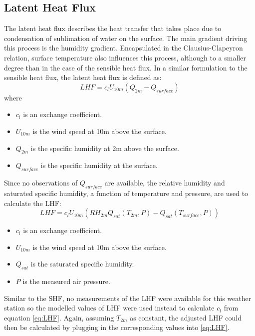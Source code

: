 \documentclass{article}
\begin{document}
\subsection*{Latent Heat Flux}
The latent heat flux describes the heat transfer that takes place due to condensation of sublimation of water on the surface. 
The main gradient driving this process is the humidity gradient. 
Encapsulated in the Clausius-Clapeyron relation, surface temperature also influences this process, although to a smaller degree than in the case of the sensible heat flux.
In a similar formulation to the sensible heat flux, the latent heat flux is defined as: 
\begin{equation*}
  LHF = c_l U_{10m} (Q_{2m} - Q_{surface})
\end{equation*}
where \vspace{-0.5\baselineskip}
\begin{itemize}[noitemsep]
  \item $c_l$ is an exchange coefficient.
  \item $U_{10m}$ is the wind speed at 10m above the surface.
  \item $Q_{2m}$ is the specific humidity at 2m above the surface.
  \item $Q_{surface}$ is the specific humidity at the surface.
\end{itemize}
Since no observations of $Q_{surface}$ are available, the relative humidity and saturated specific humidity, a function of temperature and pressure, are used to calculate the LHF:
\begin{equation}\label{eq:LHF}
  LHF = c_l U_{10m} (RH_{2m}Q_{sat}(T_{2m}, P) - Q_{sat}(T_{surface}, P))
\end{equation}
\begin{itemize}[noitemsep]
  \item $c_l$ is an exchange coefficient.
  \item $U_{10m}$ is the wind speed at 10m above the surface.
  \item $Q_{sat}$ is the saturated specific humidity.
  \item $P$ is the measured air pressure.
\end{itemize}
Similar to the SHF, no measurements of the LHF were available for this weather station so the modelled values of LHF were used instead to calculate $c_l$ from equation \eqref{eq:LHF}.
Again, assuming $T_{2m}$ as constant, the adjusted LHF could then be calculated by plugging in the corresponding values into \eqref{eq:LHF}.
\end{document}
